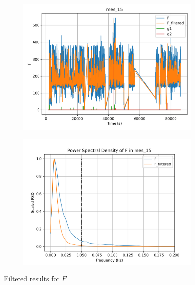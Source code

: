 \begin{figure}[H]

\begin{minipage}{0.49\textwidth}
        \begin{figure}[H]
                \centering
                \includegraphics[width = \textwidth]{./figs/trk_filt/mes_15/F.png}
        \end{figure}
\end{minipage}
\begin{minipage}{0.49\textwidth}
        \begin{figure}[H]
                \centering
                \includegraphics[width = \textwidth]{./figs/trk_filt/mes_15/F_psd.png}
        \end{figure}
\end{minipage}
\caption{Filtered results for $F$}

\end{figure}
